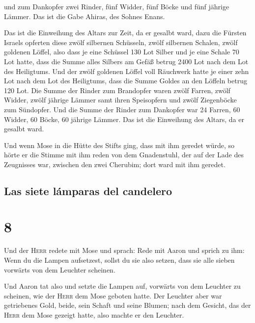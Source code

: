  und zum Dankopfer zwei Rinder, fünf Widder, fünf Böcke
und fünf jährige Lämmer. Das ist die Gabe Ahiras, des Sohnes Enans.

 Das ist die Einweihung des Altars zur Zeit, da er
gesalbt ward, dazu die Fürsten Israels opferten diese zwölf silbernen
Schüsseln, zwölf silbernen Schalen, zwölf goldenen Löffel,
 also dass je eine Schüssel 130 Lot Silber und je eine
Schale 70 Lot hatte, dass die Summe alles Silbers am Gefäß betrug 2400
Lot nach dem Lot des Heiligtums.  Und der zwölf goldenen
Löffel voll Räuchwerk hatte je einer zehn Lot nach dem Lot des
Heiligtums, dass die Summe Goldes an den Löffeln betrug 120 Lot.
 Die Summe der Rinder zum Brandopfer waren zwölf Farren,
zwölf Widder, zwölf jährige Lämmer samt ihren Speisopfern und zwölf
Ziegenböcke zum Sündopfer.  Und die Summe der Rinder zum
Dankopfer war 24 Farren, 60 Widder, 60 Böcke, 60 jährige Lämmer. Das ist
die Einweihung des Altars, da er gesalbt ward.

 Und wenn Mose in die Hütte des Stifts ging, dass mit ihm
geredet würde, so hörte er die Stimme mit ihm reden von dem Gnadenstuhl,
der auf der Lade des Zeugnisses war, zwischen den zwei Cherubim; dort
ward mit ihm geredet.

\hypertarget{las-siete-luxe1mparas-del-candelero}{%
\subsection{Las siete lámparas del
candelero}\label{las-siete-luxe1mparas-del-candelero}}

\hypertarget{section-7}{%
\section{8}\label{section-7}}

 Und der \textsc{Herr} redete mit Mose und sprach:
 Rede mit Aaron und sprich zu ihm: Wenn du die Lampen
aufsetzest, sollst du sie also setzen, dass sie alle sieben vorwärts von
dem Leuchter scheinen.

 Und Aaron tat also und setzte die Lampen auf, vorwärts
von dem Leuchter zu scheinen, wie der \textsc{Herr} dem Mose geboten
hatte.  Der Leuchter aber war getriebenes Gold, beide,
sein Schaft und seine Blumen; nach dem Gesicht, das der \textsc{Herr}
dem Mose gezeigt hatte, also machte er den Leuchter.

